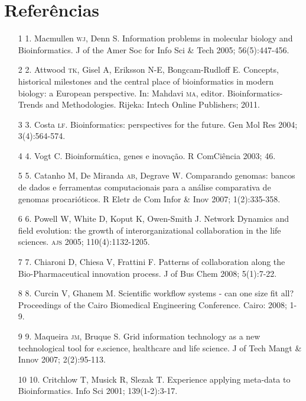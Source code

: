\documentclass{article}
\begin{document}
\section*{Referências}
\begin{itemize}

\item[1] 1. Macmullen \textsc{wj}, Denn S. Information problems in molecular biology and
Bioinformatics. J of the Amer Soc for Info Sci \& Tech 2005; 56(5):447-456.

\item[2] 2. Attwood \textsc{tk}, Gisel A, Eriksson N-E, Bongcam-Rudloff E. Concepts,
historical milestones and the central place of bioinformatics in modern biology:
a European perspective. In: Mahdavi \textsc{ma}, editor. Bioinformatics-Trends and
Methodologies. Rijeka: Intech Online Publishers; 2011.

\item[3] 3. Costa \textsc{lf}. Bioinformatics: perspectives for the future. Gen Mol Res
2004; 3(4):564-574.

\item[4] 4. Vogt C. Bioinformática, genes e inovação. R ComCiência 2003; 46.

\item[5] 5. Catanho M, De Miranda \textsc{ab}, Degrave W. Comparando genomas: bancos de
dados e ferramentas computacionais para a análise comparativa de genomas
procarióticos. R Eletr de Com Infor \& Inov 2007; 1(2):335-358.

\item[6] 6. Powell W, White D, Koput K, Owen-Smith J. Network Dynamics and field
evolution: the growth of interorganizational collaboration in the life sciences.
\textsc{ajs} 2005; 110(4):1132-1205.

\item[7] 7. Chiaroni D, Chiesa V, Frattini F. Patterns of collaboration along
the Bio-Pharmaceutical innovation process. J of Bus Chem 2008; 5(1):7-22.

\item[8] 8. Curcin V, Ghanem M. Scientific workflow systems - can one size fit
all? Proceedings of the Cairo Biomedical Engineering Conference. Cairo: 2008;
1-9.

\item[9] 9. Maqueira \textsc{jm}, Bruque S. Grid information technology as a new
technological tool for e.science, healthcare and life science. J of Tech Mangt
\& Innov 2007; 2(2):95-113.

\item[10] 10. Critchlow T, Musick R, Slezak T. Experience applying meta-data to
Bioinformatics. Info Sci 2001; 139(1-2):3-17.


\end{itemize}
\end{document}
